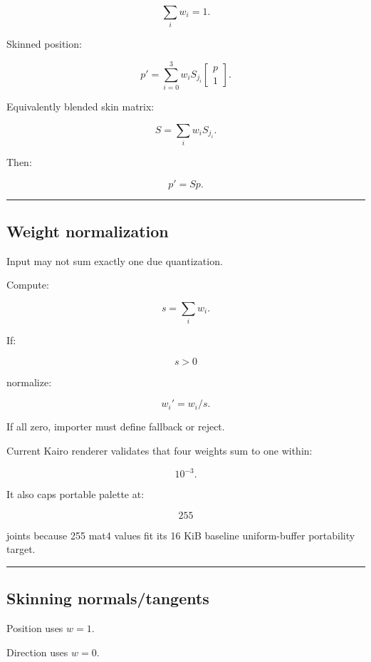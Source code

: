 \[
\boxed{
\sum_iw_i=1.
}
\]

Skinned position:

\[
\boxed{
p'
=
\sum_{i=0}^{3}
w_i
S_{j_i}
\begin{bmatrix}
p\\1
\end{bmatrix}.
}
\]

Equivalently blended skin matrix:

\[
S=
\sum_iw_iS_{j_i}.
\]

Then:

\[
p'=Sp.
\]

\begin{center}\rule{0.5\linewidth}{0.5pt}\end{center}

\subsection{Weight normalization}\label{04-visual-computing-ii-ch041-weight-normalization}

Input may not sum exactly one due quantization.

Compute:

\[
s=
\sum_iw_i.
\]

If:

\[
s>0
\]

normalize:

\[
w_i'=w_i/s.
\]

If all zero, importer must define fallback or reject.

Current Kairo renderer validates that four weights sum to one within:

\[
10^{-3}.
\]

It also caps portable palette at:

\[
255
\]

joints because 255 mat4 values fit its 16 KiB baseline uniform-buffer portability target.

\begin{center}\rule{0.5\linewidth}{0.5pt}\end{center}

\subsection{Skinning normals/tangents}\label{04-visual-computing-ii-ch041-skinning-normalstangents}

Position uses \(w=1\).

Direction uses \(w=0\).

